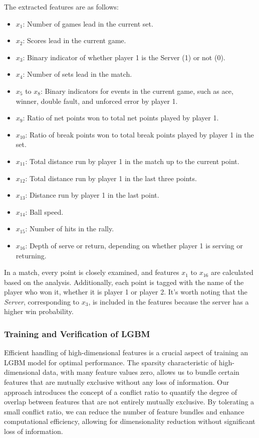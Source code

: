 \documentclass{mcmthesis}
\begin{document}
The extracted features are as follows:
\begin{itemize} \setlength\itemsep{0em}
    \item $x_1$: Number of games lead in the current set.
    \item $x_2$: Scores lead in the current game.
    \item $x_3$: Binary indicator of whether player 1 is the Server (1) or not (0).
    \item $x_4$: Number of sets lead in the match.
    \item $x_5$ to $x_8$: Binary indicators for events in the current game, such as ace, winner, double fault, and unforced error by player 1.
    \item $x_9$: Ratio of net points won to total net points played by player 1.
    \item $x_{10}$: Ratio of break points won to total break points played by player 1 in the set.
    \item $x_{11}$: Total distance run by player 1 in the match up to the current point.
    \item $x_{12}$: Total distance run by player 1 in the last three points.
    \item $x_{13}$: Distance run by player 1 in the last point.
    \item $x_{14}$: Ball speed.
    \item $x_{15}$: Number of hits in the rally.
    \item $x_{16}$: Depth of serve or return, depending on whether player 1 is serving or returning.
\end{itemize}
In a match, every point is closely examined, and features $x_1$ to $x_{16}$ are calculated based on the analysis. Additionally, each point is tagged with the name of the player who won it, whether it is player 1 or player 2. It's worth noting that the \emph{Server}, corresponding to $x_3$, is included in the features because the server has a higher win probability.

\subsubsection{Training and Verification of LGBM}
Efficient handling of high-dimensional features is a crucial aspect of training an LGBM model for optimal performance. The sparsity characteristic of high-dimensional data, with many feature values zero, allows us to bundle certain features that are mutually exclusive without any loss of information. Our approach introduces the concept of a conflict ratio to quantify the degree of overlap between features that are not entirely mutually exclusive. By tolerating a small conflict ratio, we can reduce the number of feature bundles and enhance computational efficiency, allowing for dimensionality reduction without significant loss of information.
\end{document}
